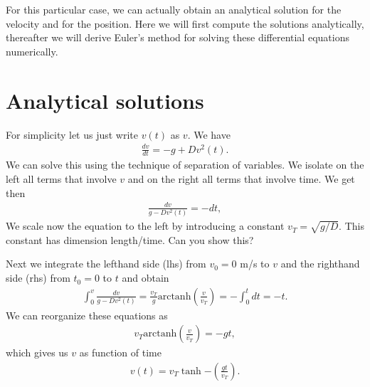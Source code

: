 \documentclass[letterpaper,10pt,english]{sphinxmanual}
\begin{document}
For this particular case, we can actually obtain an analytical
solution for the velocity and for the position. Here we will first
compute the solutions analytically, thereafter we will derive Euler’s
method for solving these differential equations numerically.


\section{Analytical solutions}
\label{\detokenize{chapter1:analytical-solutions}}
For simplicity let us just write \(v(t)\) as \(v\). We have
\begin{equation*}
\begin{split}
\frac{dv}{dt}= -g +Dv^2(t).
\end{split}
\end{equation*}
We can solve this using the technique of separation of variables. We
isolate on the left all terms that involve \(v\) and on the right all
terms that involve time. We get then
\begin{equation*}
\begin{split}
\frac{dv}{g -Dv^2(t) }= -dt,
\end{split}
\end{equation*}
We scale now the equation to the left by introducing a constant
\(v_T=\sqrt{g/D}\). This constant has dimension length/time. Can you
show this?

Next we integrate the left\sphinxhyphen{}hand side (lhs) from \(v_0=0\) m/s to \(v\) and
the right\sphinxhyphen{}hand side (rhs) from \(t_0=0\) to \(t\) and obtain
\begin{equation*}
\begin{split}
\int_{0}^v\frac{dv}{g -Dv^2(t) }= \frac{v_T}{g}\mathrm{arctanh}(\frac{v}{v_T})  =-\int_0^tdt = -t.
\end{split}
\end{equation*}
We can reorganize these equations as
\begin{equation*}
\begin{split}
v_T\mathrm{arctanh}(\frac{v}{v_T})  =-gt,
\end{split}
\end{equation*}
which gives us \(v\) as function of time
\begin{equation*}
\begin{split}
v(t)=v_T\tanh{-(\frac{gt}{v_T})}.
\end{split}
\end{equation*}
\end{document}

